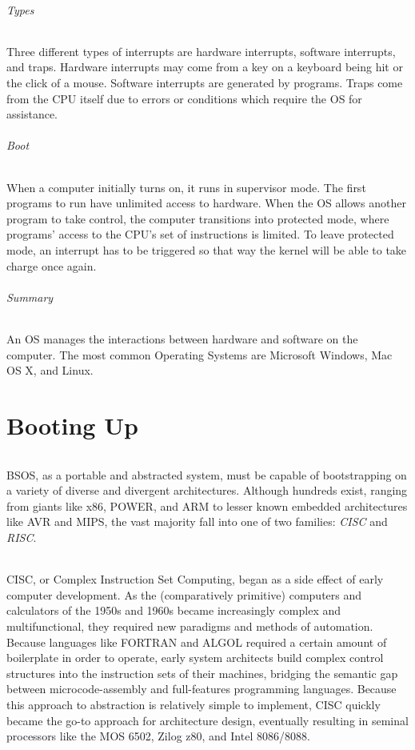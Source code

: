 \documentclass[english]{paper}
\begin{document}
\paragraph{Types}
Three different types of interrupts are hardware interrupts, software interrupts, and traps. Hardware interrupts may come from a key on a keyboard being hit or the click of a mouse. Software interrupts are generated by programs. Traps come from the CPU itself due to errors or conditions which require the OS for assistance.

\paragraph{Boot}
When a computer initially turns on, it runs in supervisor mode. The first programs to run have unlimited access to hardware. When the OS allows another program to take control, the computer transitions into protected mode, where programs' access to the CPU's set of instructions is limited. To leave protected mode, an interrupt has to be triggered so that way the kernel will be able to take charge once again.

\paragraph{Summary}
An OS manages the interactions between hardware and software on the computer. The most common Operating Systems are Microsoft Windows, Mac OS X, and Linux.

\part{Booting Up}
\paragraph{}
BSOS, as a portable and abstracted system, must be capable of bootstrapping on a variety of diverse and divergent architectures. Although hundreds exist, ranging from giants like x86, POWER, and ARM to lesser known embedded architectures like AVR and MIPS, the vast majority fall into one of two families: \textit{CISC} and \textit{RISC}.

\paragraph{}
CISC, or Complex Instruction Set Computing, began as a side effect of early computer development. As the (comparatively primitive) computers and calculators of the 1950s and 1960s became increasingly complex and multifunctional, they required new paradigms and methods of automation. Because languages like FORTRAN and ALGOL required a certain amount of boilerplate in order to operate, early system architects build complex control structures into the instruction sets of their machines, bridging the semantic gap between microcode-assembly and full-features programming languages. Because this approach to abstraction is relatively simple to implement, CISC quickly became the go-to approach for architecture design, eventually resulting in seminal processors like the MOS 6502, Zilog z80, and Intel 8086/8088.
\end{document}
